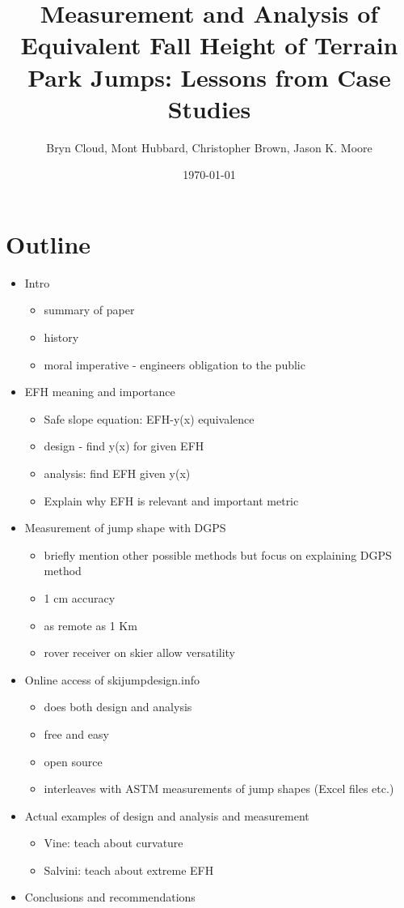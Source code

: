 \documentclass{article}
\title{Measurement and Analysis of Equivalent Fall Height of Terrain Park
  Jumps: Lessons from Case Studies}
\author{Bryn Cloud, Mont Hubbard, Christopher Brown, Jason K. Moore}
\date{\today}
\begin{document}
\maketitle

\section*{Outline}
%
\begin{itemize}
  \item Intro
  \begin{itemize}
    \item summary of paper
    \item history
    \item moral imperative - engineers obligation to the public
  \end{itemize}
  \item EFH meaning and importance
  \begin{itemize}
    \item Safe slope equation: EFH-y(x) equivalence
    \item design - find y(x) for given EFH
    \item analysis: find EFH given y(x)
    \item Explain why EFH is relevant and important metric
  \end{itemize}
  \item Measurement of jump shape with DGPS
  \begin{itemize}
    \item briefly mention other possible methods but focus on explaining DGPS
      method
    \item 1 cm accuracy
    \item as remote as 1 Km
    \item rover receiver on skier allow versatility
  \end{itemize}
  \item Online access of skijumpdesign.info
  \begin{itemize}
    \item does both design and analysis
    \item free and easy
    \item open source
    \item interleaves with ASTM measurements of jump shapes (Excel files etc.)
  \end{itemize}
  \item Actual examples of design and analysis and measurement
  \begin{itemize}
    \item Vine: teach about curvature
    \item Salvini: teach about extreme EFH
  \end{itemize}
  \item Conclusions and recommendations
\end{itemize}
\end{document}
